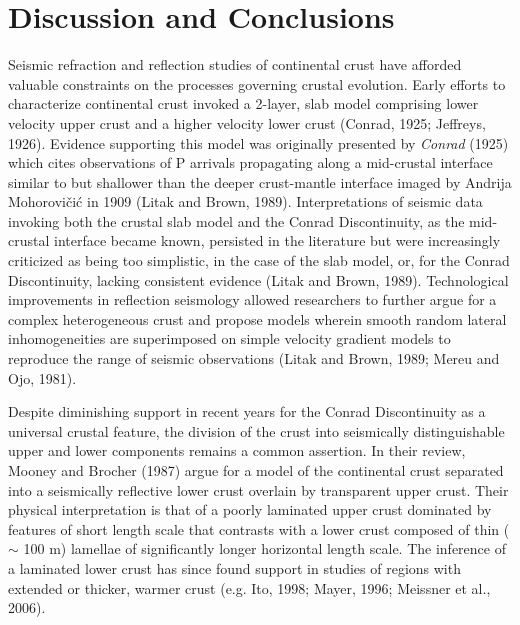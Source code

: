 \documentclass[review]{elsarticle}
\begin{document}
\section{Discussion and Conclusions}

Seismic refraction and reflection studies of continental crust have afforded valuable constraints on the processes governing crustal evolution. Early efforts to characterize continental crust invoked a 2-layer, slab model comprising lower velocity upper crust and a higher velocity lower crust (Conrad, 1925; Jeffreys, 1926). Evidence supporting this model was originally presented by {\it Conrad} (1925) which cites observations of P arrivals propagating along a mid-crustal interface similar to but shallower than the deeper crust-mantle interface imaged by Andrija Mohorovi\v{c}i\'{c} in 1909 (Litak and Brown, 1989). Interpretations of seismic data invoking both the crustal slab model and the Conrad Discontinuity, as the mid-crustal interface became known, persisted in the literature but were increasingly criticized as being too simplistic, in the case of the slab model, or, for the Conrad Discontinuity, lacking consistent evidence (Litak and Brown, 1989). Technological improvements in reflection seismology allowed researchers to further argue for a complex heterogeneous crust and propose models wherein smooth random lateral inhomogeneities are superimposed on simple velocity gradient models to reproduce the range of seismic observations (Litak and Brown, 1989; Mereu and Ojo, 1981).

Despite diminishing support in recent years for the Conrad Discontinuity as a universal crustal feature, the division of the crust into seismically distinguishable upper and lower components remains a common assertion. In their review, Mooney and Brocher (1987) argue for a model of the continental crust separated into a seismically reflective lower crust overlain by transparent upper crust. Their physical interpretation is that of a poorly laminated upper crust dominated by features of short length scale that contrasts with a lower crust composed of thin ($\sim$ 100 m) lamellae of significantly longer horizontal length scale. The inference of a laminated lower crust has since found support in studies of regions with extended or thicker, warmer crust (e.g. Ito, 1998; Mayer, 1996; Meissner et al., 2006).
\end{document}
